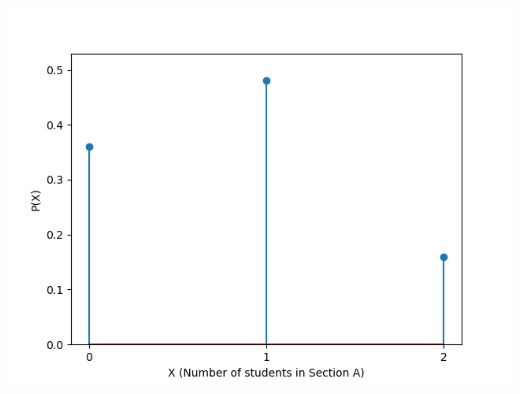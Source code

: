 \documentclass[journal,12pt,onecolumn]{IEEEtran}
\theoremstyle{remark}
\begin{document}
\begin{center}
    \includegraphics[width=\columnwidth]{figs/probability.png}
\end{center}
\end{document}
